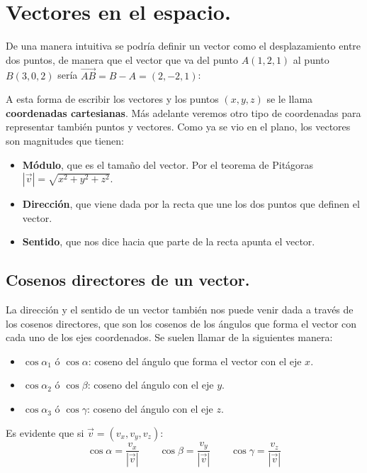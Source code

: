 \documentclass[a4paper,11pt,answers]{exam}
\begin{document}
\section{Vectores en el espacio.}
De una manera intuitiva se podría definir un vector como el desplazamiento entre dos puntos, de manera que el vector que va del punto $A(1,2,1)$ al punto $B(3,0, 2)$ sería $\overrightarrow{AB} = B - A = (2,-2,1)$:
\begin{center}
\end{center}

A esta forma de escribir los vectores y los puntos $(x, y, z)$ se le llama \textbf{coordenadas cartesianas}. Más adelante veremos otro tipo de coordenadas para representar también puntos y vectores.
Como ya se vio en el plano, los vectores son magnitudes que tienen:
\begin{itemize}
	\item \textbf{Módulo}, que es el tamaño del vector. Por el teorema de Pitágoras $\left|\vec{v}\right| =
	\sqrt{x^2 + y^2 + z^2}$.
	\item \textbf{Dirección}, que viene dada por la recta que une los dos puntos que definen el vector. 
	\item \textbf{Sentido}, que nos dice hacia que parte de la recta apunta el vector.
\end{itemize}
\subsection{Cosenos directores de un vector.}
La dirección y el sentido de un vector también nos puede venir dada a través de los cosenos directores, que son los cosenos de los ángulos que forma el vector con cada uno de los ejes coordenados. Se suelen llamar de la siguientes manera:
\begin{itemize}
	\item $\cos \alpha_1$ ó $\cos \alpha$: coseno del ángulo que forma el vector con el eje $x$.
	\item $\cos \alpha_2$ ó $\cos \beta$: coseno del ángulo con el eje $y$.
	\item $\cos \alpha_3$ ó $\cos \gamma$: coseno del ángulo con el eje $z$.
\end{itemize}
Es evidente que si $\vec{v} = (v_x, v_y, v_z)$:
\[\cos \alpha =\frac{v_x}{|\vec{v}|}\quad\quad 
\cos \beta =\frac{v_y}{|\vec{v}|}\quad\quad
\cos \gamma =\frac{v_z}{|\vec{v}|}\]
\end{document}
